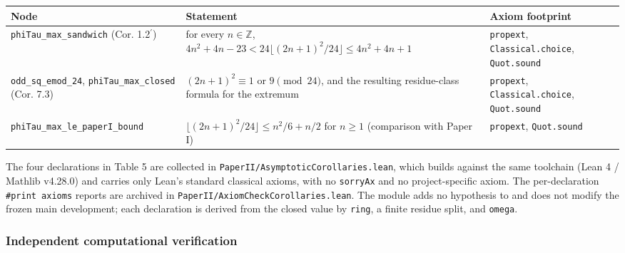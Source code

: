 \documentclass[
  american,
  11pt,
  a4paper,
]{article}
\newcounter{none} %
\begin{document}
{\def\LTcaptype{none} %
\begin{longtable}[]{@{}
  >{\raggedright\arraybackslash}p{}
  >{\raggedright\arraybackslash}p{}
  >{\raggedright\arraybackslash}p{}@{}}
\toprule\noalign{}
\begin{minipage}[b]{\linewidth}\raggedright
Node
\end{minipage} & \begin{minipage}[b]{\linewidth}\raggedright
Statement
\end{minipage} & \begin{minipage}[b]{\linewidth}\raggedright
Axiom footprint
\end{minipage} \\
\midrule\noalign{}
\endhead
\bottomrule\noalign{}
\endlastfoot
\texttt{phiTau\_max\_sandwich} (Cor. 1.2\(^{\prime}\)) & for every \(n\in\mathbb Z\), \(4n^2+4n-23<24\lfloor(2n+1)^2/24\rfloor\le4n^2+4n+1\) & \texttt{propext}, \texttt{Classical.choice}, \texttt{Quot.sound} \\
\texttt{odd\_sq\_emod\_24}, \texttt{phiTau\_max\_closed} (Cor. 7.3) & \((2n+1)^2\equiv1\) or \(9\pmod{24}\), and the resulting residue-class formula for the extremum & \texttt{propext}, \texttt{Classical.choice}, \texttt{Quot.sound} \\
\texttt{phiTau\_max\_le\_paperI\_bound} & \(\lfloor(2n+1)^2/24\rfloor\le n^2/6+n/2\) for \(n\ge1\) (comparison with Paper I) & \texttt{propext}, \texttt{Quot.sound} \\
\end{longtable}
}

The four declarations in Table 5 are collected in \texttt{PaperII/AsymptoticCorollaries.lean}, which builds against the same toolchain (Lean 4 / Mathlib v4.28.0) and carries only Lean's standard classical axioms, with no \texttt{sorryAx} and no project-specific axiom. The per-declaration \texttt{\#print\ axioms} reports are archived in \texttt{PaperII/AxiomCheckCorollaries.lean}. The module adds no hypothesis to and does not modify the frozen main development; each declaration is derived from the closed value by \texttt{ring}, a finite residue split, and \texttt{omega}.

\subsubsection{Independent computational verification}\label{independent-computational-verification}
\end{document}
